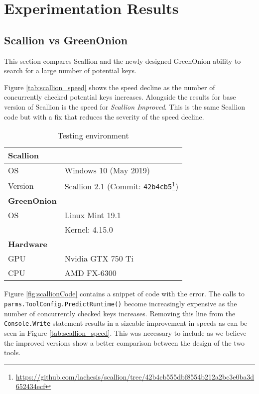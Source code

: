 \chapter{Experimentation Results}
\label{cha:Experiments}

\section{Scallion vs GreenOnion}
\label{sec:SvG}

This section compares Scallion and the newly designed GreenOnion ability to search for a large number of potential keys.

Figure \ref{tab:scallion_speed} shows the speed decline as the number of concurrently checked potential keys increases. Alongside the results for base version of Scallion is the speed for \textit{Scallion Improved}. This is the same Scallion code but with a fix that reduces the severity of the speed decline.

\begin{table}[h!]
    \centering
    \begin{tabular}{|ll|}
        \hline
        \textbf{Scallion} & \\
        \hline
        OS & Windows 10 (May 2019) \\
        Version & Scallion 2.1 (Commit: \verb|42b4cb5|\footnote{\url{https://github.com/lachesis/scallion/tree/42b4cb555dbf8554b212a2bc3e0ba3d652434ecf}}) \\
        \hline
        \textbf{GreenOnion} & \\
        \hline
        OS  & Linux Mint 19.1 \\
            & Kernel: 4.15.0 \\ 
        \hline
        \textbf{Hardware} & \\
        \hline
        GPU & Nvidia GTX 750 Ti  \\
        CPU & AMD FX-6300 \\
        \hline
    \end{tabular}
    \caption{Testing environment}
\end{table}

Figure \ref{fig:scallionCode} contains a snippet of code with the error. The calls to \verb|parms.ToolConfig.PredictRuntime()| become increasingly expensive as the number of concurrently checked keys increases. Removing this line from the \verb|Console.Write| statement results in a sizeable improvement in speeds as can be seen in Figure \ref{tab:scallion_speed}. This was necessary to include as we believe the improved versions show a better comparison between the design of the two tools. 

